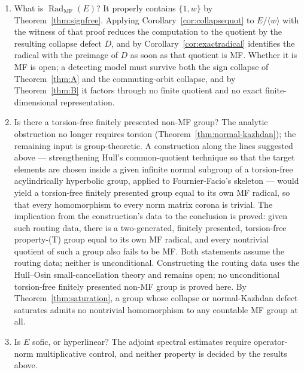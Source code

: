 \documentclass[11pt]{amsart}
\newcommand{\leanverified}[2]{\ignorespaces}
\theoremstyle{definition}
\theoremstyle{remark}
\theoremstyle{plain}
\begin{document}
\begin{enumerate}
\item What is $\operatorname{Rad}_{\mathrm{MF}}(E)$?  It properly
contains $\{1,w\}$ by Theorem~\ref{thm:signfree}.  Applying
Corollary~\ref{cor:collapsequot} to $E/\langle w\rangle$ with the
witness of that proof reduces the computation to the quotient by the
resulting collapse defect $D$, and by
Corollary~\ref{cor:exactradical} identifies the radical with the
preimage of $D$ as soon as that quotient is MF\@.  Whether it is MF
is open; a detecting model must survive both the sign collapse of
Theorem~\ref{thm:A} and the commuting-orbit collapse, and by
Theorem~\ref{thm:B} it factors through no finite quotient and no
exact finite-dimensional representation.
\item Is there a torsion-free finitely presented non-MF group?  The
analytic obstruction no longer requires torsion
(Theorem~\ref{thm:normal-kazhdan}); the remaining input is
group-theoretic.  A construction along the lines suggested above ---
strengthening Hull's common-quotient technique so that the target
elements are chosen inside a given infinite normal subgroup of a
torsion-free acylindrically hyperbolic group, applied to
Fournier-Facio's skeleton --- would yield a torsion-free finitely
presented group equal to its own MF radical, so that every
homomorphism to every norm matrix corona is trivial.  The implication
from the construction's data to the conclusion is proved: given such
routing data, there is a two-generated, finitely presented,
torsion-free property-\textup{(T)} group equal to its own MF radical,
and every nontrivial quotient of such a group also fails to be MF\@.
Both statements assume the routing data; neither is unconditional.
\leanverified{Sofic/FullMFRadicalEndpoint}{GroupApproximation.FullMFRadicalEndpoint.exists_twoGenerated_finitelyPresented_torsionFree_kazhdan_fullMFRadical}
\leanverified{Sofic/FullMFRadicalEndpoint}{GroupApproximation.FullMFRadicalEndpoint.exists_group_with_every_nontrivial_quotient_not_isCDEOperatorMF}
Constructing the routing data uses the Hull--Osin small-cancellation
theory and remains open; no unconditional torsion-free finitely
presented non-MF group is proved here.
By Theorem~\ref{thm:saturation}, a group whose
collapse or normal-Kazhdan defect saturates admits no nontrivial
homomorphism to any countable MF group at all.
\item Is $E$ sofic, or hyperlinear?  The adjoint spectral estimates
require operator-norm multiplicative control, and neither property is
decided by the results above.

\end{enumerate}
\end{document}
